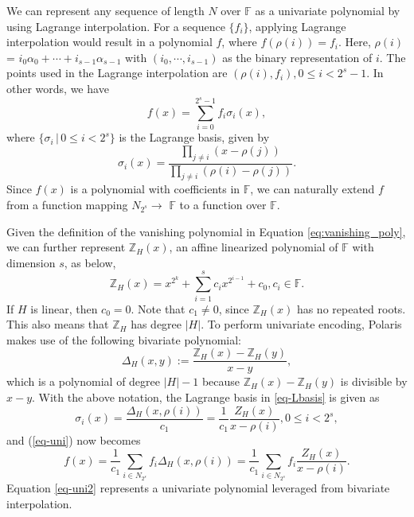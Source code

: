 We can represent any sequence of length $N$ over $\mathbb{F}$ as a univariate polynomial by using Lagrange interpolation. For a sequence $\{f_i\}$, applying Lagrange interpolation would result in a polynomial $f$, where $f(\rho(i))=f_i$. Here, $\rho(i)$  = $i_0 \alpha_0+\cdots + i_{s-1}  \alpha_{s-1}$ with $(i_0, \cdots, i_{s-1})$ as the binary representation of $i$. The  points used in the Lagrange interpolation are  
$(\rho(i), f_i), 0\le i<2^s-1$.
In other words, we have
\begin{equation}\label{eq-uni}
	f(x) = \sum_{i=0}^{2^s-1} f_i \sigma_i(x),
\end{equation}
where $\{\sigma_i \,|\, 0\le i<2^s\}$ is the Lagrange basis, given by 
\begin{equation}\label{eq-Lbasis}
	\sigma_i(x) = \frac{\prod_{j\ne i} (x-\rho(j))}{\prod_{j\ne i} (\rho(i)-\rho(j))}. 
\end{equation}
Since $f(x)$ is a polynomial with coefficients in $\mathbb{F}$, we can naturally extend $f$ from a function mapping $N_{2^s} \rightarrow$  $\mathbb{F}$ to a function over $\mathbb{F}$.

Given the definition of the vanishing polynomial in Equation \eqref{eq:vanishing_poly}, we can further represent $\mathbb{Z}_H(x)$, an affine linearized polynomial of $\mathbb{F}$ with dimension $s$, as below,
\begin{equation*}\label{eq-defZx2}
	\mathbb{Z}_H(x)=x^{2^k}+\sum_{i=1}^{s}c_ix^{2^{i-1}}+c_0, c_i\in \mathbb{F}.  
\end{equation*}
If $H$ is linear, then $c_0 = 0$. Note that $c_1 \neq 0$, since $\mathbb{Z}_H(x)$ has no repeated roots. This also means that $\mathbb{Z}_H$ has degree $|H|$. 
To perform univariate encoding, Polaris makes use of the following bivariate polynomial: 
\begin{equation}\label{eq-Delta}
	\Delta_H(x,y):=\frac{\mathbb{Z}_H(x)-\mathbb{Z}_H(y)}{x-y},
\end{equation}
which is a polynomial of degree $|H|-1$ because $\mathbb{Z}_H(x)-\mathbb{Z}_H(y)$ is divisible by $x-y$. 
With the above notation,  the Lagrange basis in \ref{eq-Lbasis} is given as 
\[
\sigma_i(x) = \frac{\Delta_H(x,\rho(i))}{c_1} = \frac{1}{c_1} \frac{Z_H(x)}{x-\rho(i)}, 0\le i<2^s,
\]
and (\ref{eq-uni}) now becomes
\begin{equation}\label{eq-uni2}
	f(x) = \frac{1}{c_1} \sum_{i\in N_{2^s}} f_i \Delta_H(x,\rho(i)) = \frac{1}{c_1} \sum_{i\in N_{2^s}} f_i  \frac{Z_H(x)}{x-\rho(i)}.
\end{equation}
Equation \eqref{eq-uni2} represents a univariate polynomial leveraged from bivariate interpolation.

